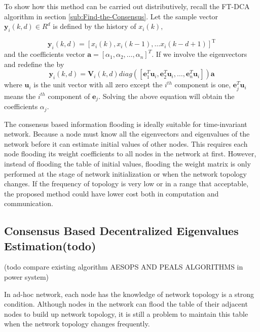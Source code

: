 To show how this method can be carried out distributively, recall
the FT-DCA algorithm in section \eqref{sub:Find-the-Consensus}. Let
the sample vector $\mathbf{y}_{i}(k,d)\in R^{d}$ is defined by the
history of $x_{i}(k),$ 

\begin{equation}
\mathbf{y}_{i}(k,d)=\left[x_{i}(k),x_{i}(k-1),\ldots x_{i}(k-d+1)\right]^{\mathrm{T}}
\end{equation}
and the coefficients vector $\mathbf{a}=\left[\alpha_{1},\alpha_{2},\ldots,\alpha_{n}\right]^{T}$.
If we involve the eigenvectors and redefine the 
by 
\begin{equation}
\mathbf{y}_{i}(k,d)=\mathbf{V}_{i}(k,d)diag\left(\left[\mathbf{e}_{1}^{T}\mathbf{u}_{i},\mathbf{e}_{2}^{T}\mathbf{u}_{i},\ldots,\mathbf{e}_{n}^{T}\mathbf{u}_{i}\right]\right)\mathbf{a}\label{eq:Vander*Eigen i^th*Alpha}
\end{equation}
where $\mathbf{u}_{i}$ is the unit vector with all zero except the
$i^{th}$ component is one, $\mathbf{e}_{j}^{T}\mathbf{u}_{i}$ means
the $i^{th}$ component of $\mathbf{e}_{j}$. Solving the above equation
will obtain the coefficients $\alpha_{j}$. 

The consensus based information flooding is ideally suitable for time-invariant
network. Because a node must know all the eigenvectors and eigenvalues
of the network before it can estimate initial values of other nodes.
This requires each node flooding its weight coefficients to all nodes
in the network at first. However, instead of flooding the table of
initial values, flooding the weight matrix is only performed at the
stage of network initialization or when the network topology changes.
If the frequency of topology is very low or in a range that acceptable,
the proposed method could have lower cost both in computation and
communication.


\subsection{Consensus Based Decentralized Eigenvalues Estimation(todo)}

(todo compare existing algorithm AESOPS AND PEALS ALGORITHMS in power
system)

In ad-hoc network, each node has the knowledge of network topology
is a strong condition. Although nodes in the network can flood the
table of their adjacent nodes to build up network topology, it is
still a problem to maintain this table when the network topology changes
frequently. 

